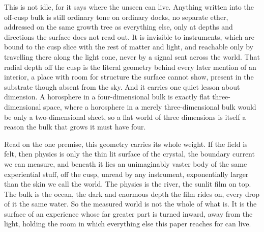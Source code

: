 This is not idle, for it says where the unseen can live. Anything written into the off-cusp bulk is still ordinary tone on ordinary docks, no separate ether, addressed on the same growth tree as everything else, only at depths and directions the surface does not read out. It is invisible to instruments, which are bound to the cusp slice with the rest of matter and light, and reachable only by travelling there along the light cone, never by a signal sent across the world. That radial depth off the cusp is the literal geometry behind every later mention of an interior, a place with room for structure the surface cannot show, present in the substrate though absent from the sky. And it carries one quiet lesson about dimension. A horosphere in a four-dimensional bulk is exactly flat three-dimensional space, where a horosphere in a merely three-dimensional bulk would be only a two-dimensional sheet, so a flat world of three dimensions is itself a reason the bulk that grows it must have four.

Read on the one premise, this geometry carries its whole weight. If the field is felt, then physics is only the thin lit surface of the crystal, the boundary current we can measure, and beneath it lies an unimaginably vaster body of the same experiential stuff, off the cusp, unread by any instrument, exponentially larger than the skin we call the world. The physics is the river, the sunlit film on top. The bulk is the ocean, the dark and enormous depth the film rides on, every drop of it the same water. So the measured world is not the whole of what is. It is the surface of an experience whose far greater part is turned inward, away from the light, holding the room in which everything else this paper reaches for can live.
